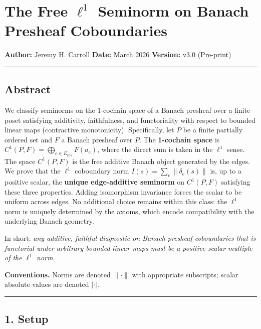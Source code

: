 \documentclass[
]{article}
\author{}
\date{}
\begin{document}
\section{\texorpdfstring{The Free \(\ell^1\) Seminorm on Banach Presheaf
Coboundaries}{The Free \textbackslash ell\^{}1 Seminorm on Banach Presheaf Coboundaries}}\label{the-free-ell1-seminorm-on-banach-presheaf-coboundaries}

\textbf{Author:} Jeremy H. Carroll \textbf{Date:} March 2026
\textbf{Version:} v3.0 (Pre-print)

\begin{center}\rule{0.5\linewidth}{0.5pt}\end{center}

\subsection{Abstract}\label{abstract}

We classify seminorms on the 1-cochain space of a Banach presheaf over a
finite poset satisfying additivity, faithfulness, and functoriality with
respect to bounded linear maps (contractive monotonicity). Specifically,
let \(P\) be a finite partially ordered set and \(F\) a Banach presheaf
over \(P\). The \textbf{1-cochain space} is
\(C^1(P, F) = \bigoplus_{e \in E_{\text{cov}}} F(a_e)\), where the
direct sum is taken in the \(\ell^1\) sense. The space \(C^1(P, F)\) is
the free additive Banach object generated by the edges. We prove that
the \(\ell^1\) coboundary norm \(I(s) = \sum_e \|\delta_e(s)\|\) is, up
to a positive scalar, the \textbf{unique edge-additive seminorm} on
\(C^1(P, F)\) satisfying these three properties. Adding isomorphism
invariance forces the scalar to be uniform across edges. No additional
choice remains within this class: the \(\ell^1\) norm is uniquely
determined by the axioms, which encode compatibility with the underlying
Banach geometry.

In short: \emph{any additive, faithful diagnostic on Banach presheaf
coboundaries that is functorial under arbitrary bounded linear maps must
be a positive scalar multiple of the \(\ell^1\) norm.}

\textbf{Conventions.} Norms are denoted \(\lVert \cdot \rVert\) with
appropriate subscripts; scalar absolute values are denoted \(|\cdot|\).

\begin{center}\rule{0.5\linewidth}{0.5pt}\end{center}

\subsection{1. Setup}\label{setup}
\end{document}
